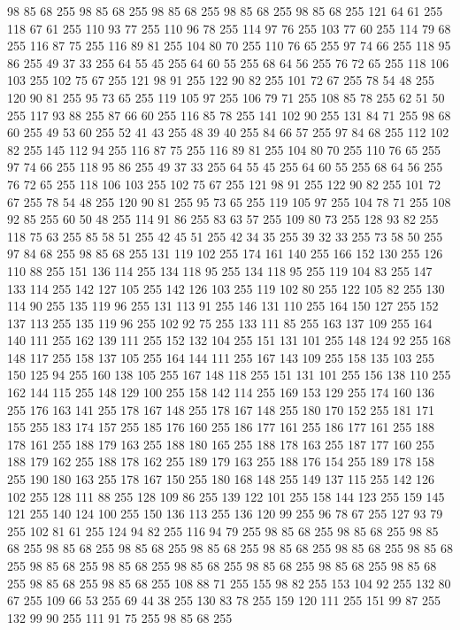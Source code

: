 98 85 68 255 98 85 68 255 98 85 68 255 98 85 68 255 98 85 68 255 121 64 61 255 118 67 61 255 110 93 77 255 110 96 78 255 114 97 76 255 103 77 60 255 114 79 68 255 116 87 75 255 116 89 81 255 104 80 70 255 110 76 65 255 97 74 66 255 118 95 86 255 49 37 33 255 64 55 45 255 64 60 55 255 68 64 56 255 76 72 65 255 118 106 103 255 102 75 67 255 121 98 91 255 122 90 82 255 101 72 67 255 78 54 48 255 120 90 81 255 95 73 65 255 119 105 97 255 106 79 71 255 108 85 78 255 62 51 50 255 117 93 88 255 87 66 60 255 116 85 78 255 141 102 90 255 131 84 71 255 98 68 60 255 49 53 60 255 52 41 43 255 48 39 40 255 84 66 57 255 97 84 68 255 112 102 82 255 145 112 94 255 116 87 75 255 116 89 81 255 104 80 70 255 110 76 65 255 97 74 66 255 118 95 86 255 49 37 33 255 64 55 45 255 64 60 55 255 68 64 56 255 76 72 65 255 118 106 103 255 102 75 67 255 121 98 91 255 122 90 82 255 101 72 67 255
78 54 48 255 120 90 81 255 95 73 65 255 119 105 97 255 104 78 71 255 108 92 85 255 60 50 48 255 114 91 86 255 83 63 57 255 109 80 73 255 128 93 82 255 118 75 63 255 85 58 51 255 42 45 51 255 42 34 35 255 39 32 33 255 73 58 50 255 97 84 68 255 98 85 68 255 131 119 102 255 174 161 140 255 166 152 130 255 126 110 88 255 151 136 114 255 134 118 95 255 134 118 95 255 119 104 83 255 147 133 114 255 142 127 105 255 142 126 103 255 119 102 80 255 122 105 82 255 130 114 90 255 135 119 96 255 131 113 91 255 146 131 110 255 164 150 127 255 152 137 113 255 135 119 96 255 102 92 75 255 133 111 85 255 163 137 109 255 164 140 111 255 162 139 111 255 152 132 104 255 151 131 101 255 148 124 92 255 168 148 117 255 158 137 105 255 164 144 111 255 167 143 109 255 158 135 103 255 150 125 94 255 160 138 105 255 167 148 118 255 151 131 101 255 156 138 110 255 162 144 115 255 148 129 100 255 158 142 114 255 169 153 129 255 174 160 136 255 176 163 141 255 178 167 148 255
178 167 148 255 180 170 152 255 181 171 155 255 183 174 157 255 185 176 160 255 186 177 161 255 186 177 161 255 188 178 161 255 188 179 163 255 188 180 165 255 188 178 163 255 187 177 160 255 188 179 162 255 188 178 162 255 189 179 163 255 188 176 154 255 189 178 158 255 190 180 163 255 178 167 150 255 180 168 148 255 149 137 115 255 142 126 102 255 128 111 88 255 128 109 86 255 139 122 101 255 158 144 123 255 159 145 121 255 140 124 100 255 150 136 113 255 136 120 99 255 96 78 67 255 127 93 79 255 102 81 61 255 124 94 82 255 116 94 79 255 98 85 68 255 98 85 68 255 98 85 68 255 98 85 68 255 98 85 68 255 98 85 68 255 98 85 68 255 98 85 68 255 98 85 68 255 98 85 68 255 98 85 68 255 98 85 68 255 98 85 68 255 98 85 68 255 98 85 68 255 98 85 68 255 98 85 68 255 108 88 71 255 155 98 82 255 153 104 92 255 132 80 67 255 109 66 53 255 69 44 38 255 130 83 78 255 159 120 111 255 151 99 87 255 132 99 90 255 111 91 75 255 98 85 68 255
